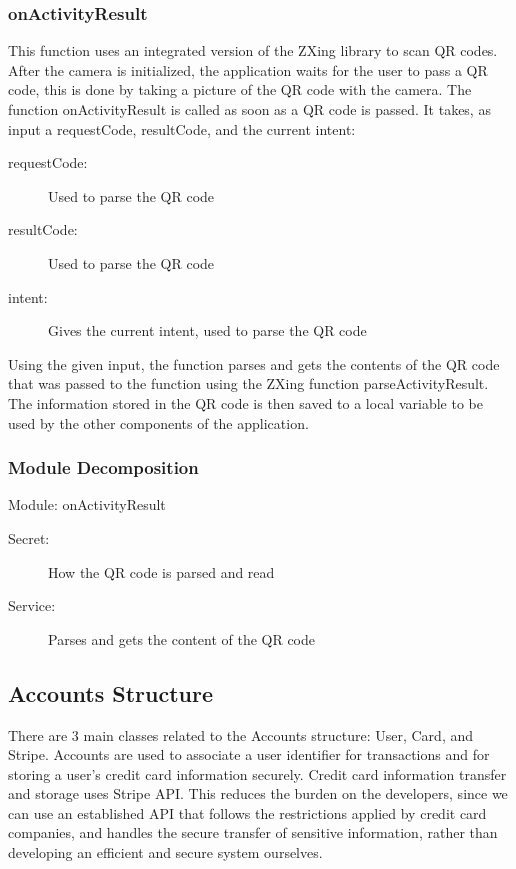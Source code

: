 \documentclass[12pt, titlepage]{article}
\begin{document}
\subsubsection{onActivityResult}
This function uses an integrated version of the ZXing library to scan QR codes. After the camera is initialized, the application waits for the user to pass a QR code, this is done by taking a picture of the QR code with the camera. The function onActivityResult is called as soon as a QR code is passed. It takes, as input a requestCode, resultCode, and the current intent: 

\begin{description}
  \item[requestCode:] Used to parse the QR code 
  \item[resultCode:] Used to parse the QR code 
  \item[intent:] Gives the current intent, used to parse the QR code
\end{description}

Using the given input, the function parses and gets the contents of the QR code that was passed to the function using the ZXing function parseActivityResult. The information stored in the QR code is then saved to a local variable to be used by the other components of the application.

\subsubsection{Module Decomposition}

Module: onActivityResult
\begin{description}
	\item[Secret:]How the QR code is parsed and read
	\item[Service:] Parses and gets the content of the QR code
\end{description}

\subsection{Accounts Structure}
There are 3 main classes related to the Accounts structure: User, Card, and Stripe. Accounts are used to associate a user identifier for transactions and for storing a user's credit card information securely. Credit card information transfer and storage uses Stripe API. This reduces the burden on the developers, since we can use an established API that follows the restrictions applied by credit card companies, and handles the secure transfer of sensitive information, rather than developing an efficient and secure system ourselves.
\end{document}
